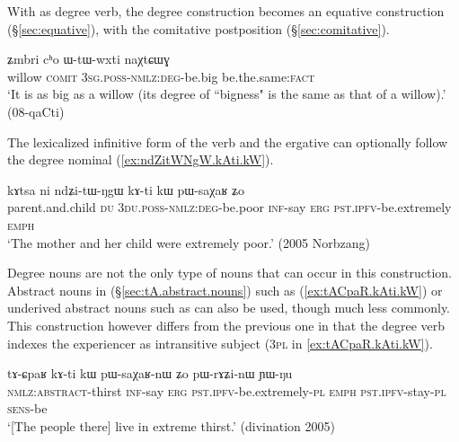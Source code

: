 With  as degree verb, the degree construction becomes an equative construction (§\ref{sec:equative}), with the comitative postposition  (§\ref{sec:comitative}). 


\begin{exe}
\ex \label{ex:WtWwxti.naXtCWG}
\gll ʑmbri cʰo ɯ-tɯ-wxti naχtɕɯɣ \\
willow \textsc{comit} \textsc{3sg}.\textsc{poss}-\textsc{nmlz}:\textsc{deg}-be.big be.the.same:\textsc{fact} \\
\glt `It is as big as a willow (its degree of ``bigness" is the same as that of a willow).' (08-qaCti)
\end{exe}

The lexicalized infinitive form  of the verb  and the ergative can optionally follow the degree nominal (\ref{ex:ndZitWNgW.kAti.kW}).


\begin{exe}
\ex \label{ex:ndZitWNgW.kAti.kW}
\gll kɤtsa ni ndʑi-tɯ-ŋgɯ kɤ-ti kɯ pɯ-saχaʁ ʑo \\
parent.and.child \textsc{du} \textsc{3du}.\textsc{poss}-\textsc{nmlz}:\textsc{deg}-be.poor \textsc{inf}-say \textsc{erg} \textsc{pst}.\textsc{ipfv}-be.extremely \textsc{emph} \\
\glt `The mother and her child were extremely poor.' (2005 Norbzang)
\end{exe}

Degree nouns are not the only type of nouns that can occur in this construction. Abstract nouns in  (§\ref{sec:tA.abstract.nouns}) such as  (\ref{ex:tACpaR.kAti.kW}) or underived abstract nouns such as  can also be used, though much less commonly.  This construction however differs from the previous one in that the degree verb  indexes the experiencer as intransitive subject (\textsc{3pl} in \ref{ex:tACpaR.kAti.kW}).
  
\begin{exe}
\ex \label{ex:tACpaR.kAti.kW}
\gll  tɤ-ɕpaʁ kɤ-ti kɯ pɯ-saχaʁ-nɯ ʑo pɯ-rɤʑi-nɯ ɲɯ-ŋu  \\
\textsc{nmlz}:\textsc{abstract}-thirst \textsc{inf}-say \textsc{erg} \textsc{pst}.\textsc{ipfv}-be.extremely-\textsc{pl} \textsc{emph} \textsc{pst}.\textsc{ipfv}-stay-\textsc{pl} \textsc{sens}-be \\
\glt `[The people there] live in extreme thirst.' (divination 2005)
\end{exe}

